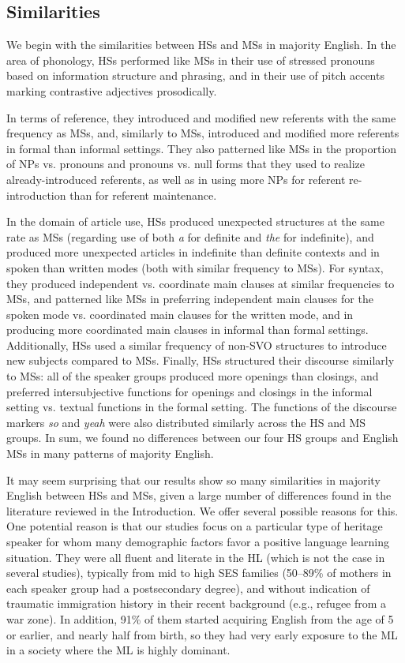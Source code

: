 \documentclass[output=paper,colorlinks,citecolor=brown]{langscibook}
\begin{document}
\subsection{Similarities} \label{sec:pashkovaetal:Similarities}

We begin with the similarities between HSs and MSs in majority English. In the area of phonology, HSs performed like MSs in their use of stressed pronouns based on information structure and phrasing, and in their use of pitch accents marking contrastive adjectives prosodically.

In terms of reference, they introduced and modified new referents with the same frequency as MSs, and, similarly to MSs, introduced and modified more referents in formal than informal settings. They also patterned like MSs in the proportion of NPs vs. pronouns and pronouns vs. null forms that they used to realize already-introduced referents, as well as in using more NPs for referent re-introduction than for referent maintenance.

In the domain of article use, HSs produced unexpected structures at the same rate as MSs (regarding use of both \textit{a} for definite and \textit{the} for indefinite), and produced more unexpected articles in indefinite than definite contexts and in spoken than written modes (both with similar frequency to MSs). For syntax, they produced independent vs. coordinate main clauses at similar frequencies to MSs, and patterned like MSs in preferring independent main clauses for the spoken mode vs. coordinated main clauses for the written mode, and in producing more coordinated main clauses in informal than formal settings. Additionally, HSs used a similar frequency of non-SVO structures to introduce new subjects compared to MSs. Finally, HSs structured their discourse similarly to MSs: all of the speaker groups produced more openings than closings, and preferred intersubjective functions for openings and closings in the informal setting vs. textual functions in the formal setting. The functions of the discourse markers \textit{so} and \textit{yeah} were also distributed similarly across the HS and MS groups. In sum, we found no differences between our four HS groups and English MSs in many patterns of majority English.

It may seem surprising that our results show so many similarities in majority English between HSs and MSs, given a large number of differences found in the literature reviewed in the Introduction. We offer several possible reasons for this. One potential reason is that our studies focus on a particular type of heritage speaker for whom many demographic factors favor a positive language learning situation. They were all fluent and literate in the HL (which is not the case in several studies), typically from mid to high SES families (50--89\% of mothers in each speaker group had a postsecondary degree), and without indication of traumatic immigration history in their recent background (e.g., refugee from a war zone). In addition, 91\% of them started acquiring English from the age of 5 or earlier, and nearly half from birth, so they had very early exposure to the ML in a society where the ML is highly dominant.
\end{document}
